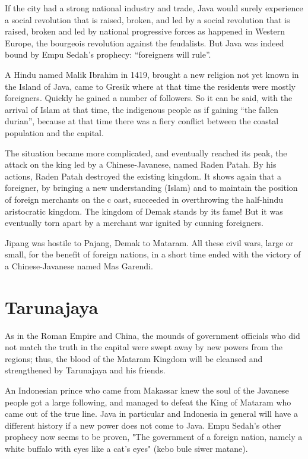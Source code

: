 If the city had a strong national industry and trade, Java would surely experience a social revolution that is 
raised, broken, and led by a social revolution that is raised, broken and led by national progressive forces 
as happened in Western Europe, the bourgeois revolution against the feudalists.
But Java was indeed bound by Empu Sedah's prophecy: “foreigners will rule”.\vskip 0.2in

A Hindu named Malik Ibrahim in 1419, brought a new religion not yet known in the Island of 
Java, came to Gresik where at that time the residents were mostly foreigners. Quickly he 
gained a number of followers. So it can be said, with the arrival of Islam at that time, the 
indigenous people as if gaining “the fallen durian”, because at that time there was a fiery 
conflict between the coastal population and the capital.\vskip 0.2in

The situation became more complicated, and eventually reached its peak, 
the attack on the king led by a Chinese-Javanese, named Raden Patah. By his actions, 
Raden Patah destroyed the existing kingdom. It shows again that a foreigner, 
by bringing a new understanding (Islam) and to maintain the position of foreign merchants on the c
oast, succeeded in overthrowing the half-hindu aristocratic kingdom. The kingdom of 
Demak stands by its fame! But it was eventually torn apart by a merchant war ignited by cunning foreigners.\vskip 0.2in

Jipang was hostile to Pajang, Demak to Mataram. All these civil wars, 
large or small, for the benefit of foreign nations, in a short time ended with the victory 
of a Chinese-Javanese named Mas Garendi.\vskip 0.2in

\section{Tarunajaya}

As in the Roman Empire and China, the mounds of government officials who did not match 
the truth in the capital were swept away by new powers from the regions; thus, the blood 
of the Mataram Kingdom will be cleansed and strengthened by Tarunajaya and his friends.\vskip 0.2in

An Indonesian prince who came from Makassar knew the soul of the Javanese people got a large 
following, and managed to defeat the King of Mataram who came out of the true line. Java in 
particular and Indonesia in general will have a different history if a new power does not come 
to Java. Empu Sedah's other prophecy now seems to be proven, "The government of a foreign nation, 
namely a white buffalo with eyes like a cat's eyes" (kebo bule siwer matane).\vskip 0.2in

